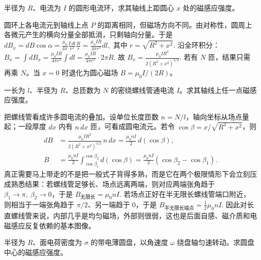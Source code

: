 \documentclass[lang=cn,11pt]{elegantbook}
\begin{document}
\begin{exercise}[圆形电流环轴线上的磁场]
半径为 \(R\)、电流为 \(I\) 的圆形电流环，求其轴线上距圆心 \(x\) 处的磁感应强度。
\end{exercise}

\begin{solution}
圆环上各电流元到轴线上点 \(P\) 的距离相同，但磁场方向不同。由对称性，圆周上各微元产生的横向分量全部抵消，只剩轴向分量。于是
 \(dB_x=dB\cos\alpha =\frac{\mu_0}{4\pi}\frac{I\,dl}{r^2}\frac{R}{r} =\frac{\mu_0IR}{4\pi r^3}dl,\) 
其中
 \(r=\sqrt{R^2+x^2}.\) 
沿全环积分：
 \(B_x=\int dB_x =\frac{\mu_0IR}{4\pi r^3}\int dl =\frac{\mu_0IR}{4\pi r^3}\cdot 2\pi R.\) 
故
 \(\boxed{ B_x=\frac{\mu_0IR^2}{2(R^2+x^2)^{3/2}} }.\) 
若有 \(N\) 匝，结果只需再乘 \(N\)。当 \(x=0\) 时退化为圆心磁场 \(B=\mu_0I/(2R)\)。
\end{solution}

\begin{exercise}[有限长螺线管轴线上的磁场]
一长为 \(l\)、半径为 \(R\)、总匝数为 \(N\) 的密绕螺线管通电流 \(I\)。求其轴线上任一点磁感应强度。
\end{exercise}

\begin{solution}
把螺线管看成许多圆电流的叠加。设单位长度匝数 \(n=N/l\)，轴向坐标从场点量起；一段厚度 \(dx\) 内有 \(n\,dx\) 匝，可看成圆电流元。若令 \(\cos\beta=x/\sqrt{R^2+x^2}\)，则
\[
\begin{aligned}
dB&=\frac{\mu_0 I R^2}{2(R^2+x^2)^{3/2}}\,n\,dx
=\frac{\mu_0 nI}{2}\,d(\cos\beta),\\
B&=\frac{\mu_0 nI}{2}
\int_{\cos\beta_1}^{\cos\beta_2}d(\cos\beta)
=\frac{\mu_0 nI}{2}\left(\cos\beta_2-\cos\beta_1\right).
\end{aligned}
\]
真正需要马上带走的不是把一般式子背得多熟，而是它在两个极限情形下会立刻压成熟悉结果：若螺线管足够长、场点远离两端，则对应两端张角趋于 \(\beta_1\to \pi,\ \beta_2\to 0\)，于是
 \(B_{\text{无限长}}=\mu_0 nI.\) 
若场点正好在半无限长螺线管端口附近，则相当于一端张角趋于 \(\pi/2\)、另一端趋于 \(0\)，于是
 \(B_{\text{半无限长端点}}=\frac12\mu_0 nI.\) 
因此对长直螺线管来说，内部几乎是均匀磁场，外部则很弱，这也是后面自感、磁介质和电磁感应反复依赖的基本图像。
\end{solution}

\begin{exercise}[旋转带电圆盘中心的磁场]
半径为 \(R\)、面电荷密度为 \(\sigma\) 的带电薄圆盘，以角速度 \(\omega\) 绕盘轴匀速转动。求圆盘中心的磁感应强度。
\end{exercise}
\end{document}
